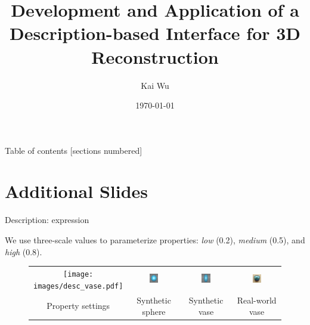 \documentclass[10pt]{beamer}
\title[Interface of 3D Reconstruction]{Development and Application of a Description-based Interface for 3D Reconstruction} %
\author{Kai Wu}
\institute[UBC]
{
University of British Columbia \\ %
\medskip
kaywu@ece.ubc.ca \\ %
}
\date{\today}
\begin{document}
\begin{frame}
\maketitle
\end{frame}

\begin{frame}{Table of contents}
  [sections numbered]
  \tableofcontents[hideallsubsections]
\end{frame}


\section{Additional Slides}
\begin{frame}{Description: expression}

We use three-scale values to parameterize properties: \textit{low} (0.2), \textit{medium} (0.5), and \textit{high} (0.8).

\begin{figure}[!htbp]
\centering
\begin{tabular}{cccc}
  \texttt{[image: images/desc\_vase.pdf]}&
  \includegraphics[width=0.2\textwidth]{interp/ui/ui_sphere.png}&
  \includegraphics[width=0.2\textwidth]{interp/ui/ui_vase.png}&
  \includegraphics[width=0.2\textwidth]{interp/real_world_img/vase/vase.jpg}\\
  Property settings & Synthetic sphere & Synthetic vase & Real-world vase\\
\end{tabular}
\end{figure}

\end{frame}
\end{document}
